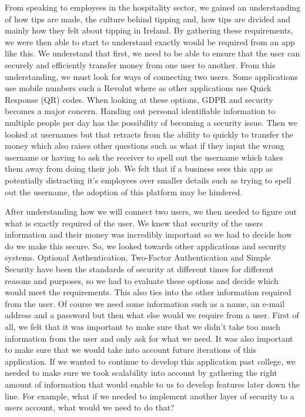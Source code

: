From speaking to employees in the hospitality sector, we gained an understanding of how tips are made, the culture behind tipping and, how tips are divided and mainly how they felt about tipping in Ireland. By gathering these requirements, we were then able to start to understand exactly would be required from an app like this. We understand that first, we need to be able to ensure that the user can securely and efficiently transfer money from one user to another. From this understanding, we must look for ways of connecting two users. Some applications use mobile numbers such a Revolut where as other applications use Quick Response (QR) codes. When looking at these options, GDPR and security becomes a major concern. Handing out personal identifiable information to multiple people per day has the possibility of becoming a security issue. Then we looked at usernames but that retracts from the ability to quickly to transfer the money which also raises other questions such as what if they input the wrong username or having to ask the receiver to spell out the username which takes them away from doing their job. We felt that if a business sees this app as potentially distracting it's employees over smaller details such as trying to spell out the username, the adoption of this platform may be hindered. 

After understanding how we will connect two users, we then needed to figure out what is exactly required of the user. We knew that security of the users information and their money was incredibly important so we had to decide how do we make this secure. So, we looked towards other applications and security systems. Optional Authentication, Two-Factor Authentication and Simple Security have been the standards of security at different times for different reasons and purposes, so we had to evaluate these options and decide which would meet the requirements. This also ties into the other information required from the user. Of course we need some information such as a name, an e-mail address and a password but then what else would we require from a user. First of all, we felt that it was important to make sure that we didn't take too much information from the user and only ask for what we need. It was also important to make sure that we would take into account future iterations of this application. If we wanted to continue to develop this application past college, we needed to make sure we took scalability into account by gathering the right amount of information that would enable to us to develop features later down the line. For example, what if we needed to implement another layer of security to a users account, what would we need to do that?

